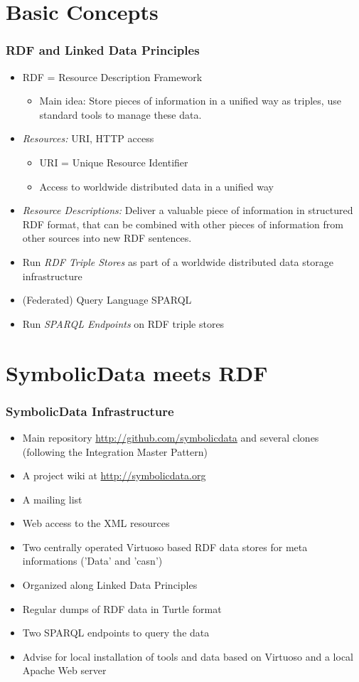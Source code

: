 \documentclass{beamer}
\begin{document}
\section{Basic Concepts}
\begin{frame}\frametitle{RDF and Linked Data Principles}
\begin{itemize}
\item RDF = Resource Description Framework
\begin{itemize}\small
\item Main idea: Store pieces of information in a unified way as triples,
  use standard tools to manage these data.
\end{itemize}
\item \emph{Resources:} URI, HTTP access
\begin{itemize}\small
\item URI = Unique Resource Identifier
\item Access to worldwide distributed data in a unified way
\end{itemize}
\item \emph{Resource Descriptions:} Deliver a valuable piece of information in
  structured RDF format, that can be combined with other pieces of information
  from other sources into new RDF sentences.
\item Run \emph{RDF Triple Stores} as part of a worldwide distributed data
  storage infrastructure
\item (Federated) Query Language SPARQL
\item Run \emph{SPARQL Endpoints} on RDF triple stores
\end{itemize}
\end{frame}

\section{SymbolicData meets RDF}
\begin{frame}\frametitle{SymbolicData Infrastructure}
\begin{itemize}
\item Main repository \url{http://github.com/symbolicdata} and several clones
  (following the Integration Master Pattern)
\item A project wiki at \url{http://symbolicdata.org}
\item A mailing list
\item Web access to the XML resources
\item Two centrally operated Virtuoso based RDF data stores for meta
  informations ('Data' and 'casn')
\item Organized along Linked Data Principles
\item Regular dumps of RDF data in Turtle format
\item Two SPARQL endpoints to query the data
\item Advise for local installation of tools and data based on Virtuoso and a
  local Apache Web server
\end{itemize}
\end{frame}
\end{document}
